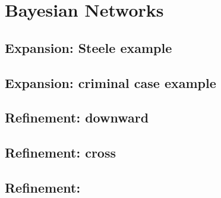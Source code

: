 \documentclass[
  11pt,
  dvipsnames,enabledeprecatedfontcommands]{scrartcl}
\begin{document}
\hypertarget{bayesian-networks}{%
\section{Bayesian Networks}\label{bayesian-networks}}

\hypertarget{expansion-steele-example}{%
\subsection{Expansion: Steele example}\label{expansion-steele-example}}

\hypertarget{expansion-criminal-case-example}{%
\subsection{Expansion: criminal case
example}\label{expansion-criminal-case-example}}

\hypertarget{refinement-downward}{%
\subsection{Refinement: downward}\label{refinement-downward}}

\hypertarget{refinement-cross}{%
\subsection{Refinement: cross}\label{refinement-cross}}

\hypertarget{refinement}{%
\subsection{Refinement:}\label{refinement}}
\end{document}
